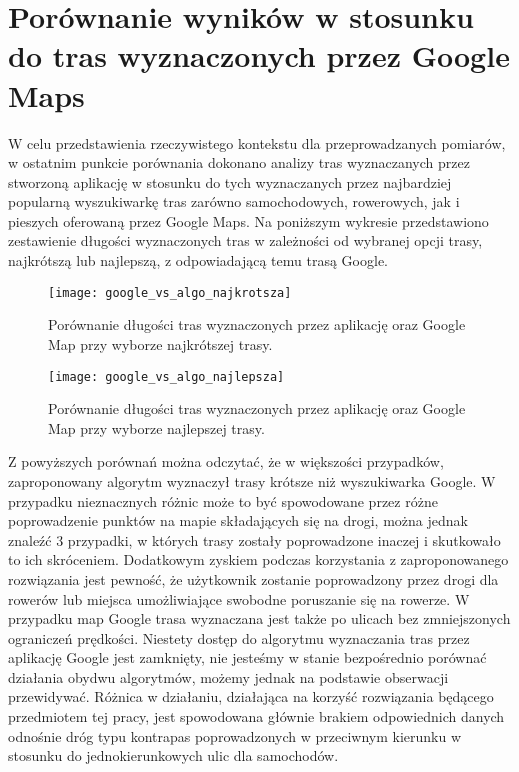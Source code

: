 \section{Porównanie wyników w stosunku do tras wyznaczonych przez Google Maps}

W celu przedstawienia rzeczywistego kontekstu dla przeprowadzanych pomiarów, w ostatnim punkcie porównania dokonano analizy tras wyznaczanych przez stworzoną aplikację w stosunku do tych wyznaczanych przez najbardziej popularną wyszukiwarkę tras zarówno samochodowych, rowerowych, jak i pieszych oferowaną przez Google Maps. Na poniższym wykresie przedstawiono zestawienie długości wyznaczonych tras w zależności od wybranej opcji trasy, najkrótszą lub najlepszą, z odpowiadającą temu trasą Google.

\begin{figure}[H]
\centering
\texttt{[image: google\_vs\_algo\_najkrotsza]}
\caption{Porównanie długości tras wyznaczonych przez aplikację oraz Google Map przy wyborze najkrótszej trasy.}
\end{figure}

\begin{figure}[H]
\centering
\texttt{[image: google\_vs\_algo\_najlepsza]}
\caption{Porównanie długości tras wyznaczonych przez aplikację oraz Google Map przy wyborze najlepszej trasy.}
\end{figure}

Z powyższych porównań można odczytać, że w większości przypadków, zaproponowany algorytm wyznaczył trasy krótsze niż wyszukiwarka Google. W przypadku nieznacznych różnic może to być spowodowane przez różne poprowadzenie punktów na mapie składających się na drogi, można jednak znaleźć 3 przypadki, w których trasy zostały poprowadzone inaczej i skutkowało to ich skróceniem. Dodatkowym zyskiem podczas korzystania z zaproponowanego rozwiązania jest pewność, że użytkownik zostanie poprowadzony przez drogi dla rowerów lub miejsca umożliwiające swobodne poruszanie się na rowerze. W przypadku map Google trasa wyznaczana jest także po ulicach bez zmniejszonych ograniczeń prędkości. Niestety dostęp do algorytmu wyznaczania tras przez aplikację Google jest zamknięty, nie jesteśmy w stanie bezpośrednio porównać działania obydwu algorytmów, możemy jednak na podstawie obserwacji przewidywać. Różnica w działaniu, działająca na korzyść  rozwiązania będącego przedmiotem tej pracy, jest spowodowana głównie brakiem odpowiednich danych odnośnie dróg typu kontrapas poprowadzonych w przeciwnym kierunku w stosunku do jednokierunkowych ulic dla samochodów.